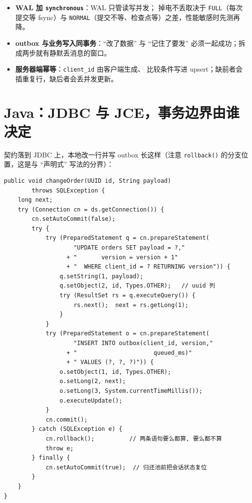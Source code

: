 \documentclass[12pt,a4paper,fontset=fandol]{ctexbook}
\newcommand{\Fn}[1]{\texttt{#1()}}
\newcommand{\Tp}[1]{\texttt{#1}}
\begin{document}
\begin{warning}[title=崩溃恢复的三根支柱，缺一根就漏数据]
\begin{itemize}
  \item \textbf{WAL 加 \Tp{synchronous}}：WAL 只管读写并发；
        掉电不丢取决于 \Tp{FULL}（每次提交等 fsync）与
        \Tp{NORMAL}（提交不等、检查点等）之差，性能敏感时先测再降。
  \item \textbf{outbox 与业务写入同事务}：``改了数据'' 与
        ``记住了要发'' 必须一起成功；拆成两步就有静默丢消息的窗口。
  \item \textbf{服务器端幂等}：\Tp{client\_id} 由客户端生成、
        比较条件写进 upsert；缺前者会插重复行，缺后者会丢并发更新。
\end{itemize}
\end{warning}

\section{Java：JDBC 与 JCE，事务边界由谁决定}

契约落到 JDBC 上，本地改一行并写 outbox 长这样（注意 \Fn{rollback}
的分支位置，这是与 ``声明式'' 写法的分界）：

\begin{lstlisting}[style=javastyle,caption={Java：手工事务内的业务写入加 outbox}]
public void changeOrder(UUID id, String payload)
        throws SQLException {
    long next;
    try (Connection cn = ds.getConnection()) {
        cn.setAutoCommit(false);
        try {
            try (PreparedStatement q = cn.prepareStatement(
                    "UPDATE orders SET payload = ?,"
                  + "       version = version + 1"
                  + "  WHERE client_id = ? RETURNING version")) {
                q.setString(1, payload);
                q.setObject(2, id, Types.OTHER);   // uuid 列
                try (ResultSet rs = q.executeQuery()) {
                    rs.next();  next = rs.getLong(1);
                }
            }
            try (PreparedStatement o = cn.prepareStatement(
                    "INSERT INTO outbox(client_id, version,"
                  + "                      queued_ms)"
                  + " VALUES (?, ?, ?)")) {
                o.setObject(1, id, Types.OTHER);
                o.setLong(2, next);
                o.setLong(3, System.currentTimeMillis());
                o.executeUpdate();
            }
            cn.commit();
        } catch (SQLException e) {
            cn.rollback();          // 两条语句要么都算, 要么都不算
            throw e;
        } finally {
            cn.setAutoCommit(true);  // 归还池前把会话状态复位
        }
    }
}
\end{lstlisting}
\end{document}
